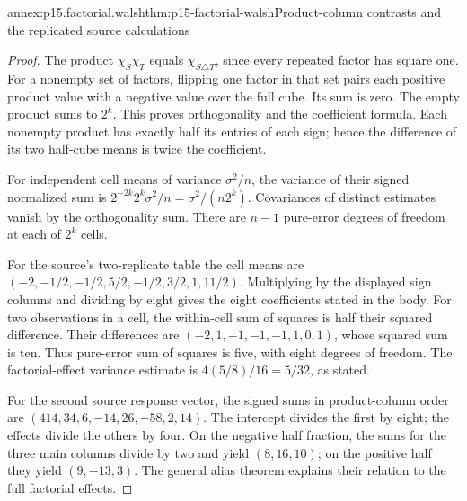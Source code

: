 \begin{annexitem}{annex:p15.factorial.walsh}{thm:p15-factorial-walsh}{Product-column contrasts and the replicated source calculations}
\begin{proof}
The product \(\chi_S\chi_T\) equals \(\chi_{S\triangle T}\), since
every repeated factor has square one. For a nonempty set of factors,
flipping one factor in that set pairs each positive product value with
a negative value over the full cube. Its sum is zero. The empty product
sums to \(2^k\). This proves orthogonality and the coefficient formula.
Each nonempty product has exactly half its entries of each sign; hence
the difference of its two half-cube means is twice the coefficient.

For independent cell means of variance \(\sigma^2/n\), the variance
of their signed normalized sum is
\(2^{-2k}2^k\sigma^2/n=\sigma^2/(n2^k)\). Covariances of distinct
estimates vanish by the orthogonality sum. There are \(n-1\) pure-error
degrees of freedom at each of \(2^k\) cells.

For the source's two-replicate table the cell means are
\((-2,-1/2,-1/2,5/2,-1/2,3/2,1,11/2)\).
Multiplying by the displayed sign columns and dividing by eight gives
the eight coefficients stated in the body. For two observations in a
cell, the within-cell sum of squares is half their squared difference.
Their differences are \((-2,1,-1,-1,-1,1,0,1)\), whose squared sum
is ten. Thus pure-error sum of squares is five, with eight degrees of
freedom. The factorial-effect variance estimate is
\(4(5/8)/16=5/32\), as stated.

For the second source response vector, the signed sums in product-column
order are
\((414,34,6,-14,26,-58,2,14)\).
The intercept divides the first by eight; the effects divide the others
by four. On the negative half fraction, the sums for the three main
columns divide by two and yield \((8,16,10)\); on the positive half
they yield \((9,-13,3)\). The general alias theorem explains their
relation to the full factorial effects.
\end{proof}
\end{annexitem}

